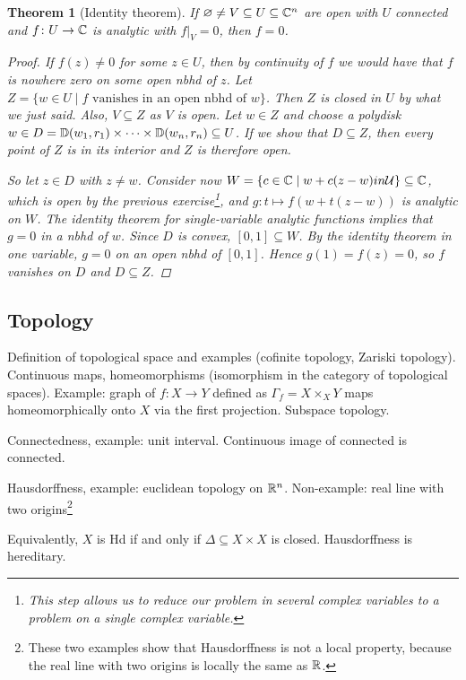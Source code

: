 \documentclass[A4paper, british]{amsart}
\theoremstyle{darkgreentheorem}
\newtheorem{thm}{Theorem}[section]
\theoremstyle{darkbluedefinition}
\theoremstyle{darkredexample}
\theoremstyle{remark}
\newcommand{\1}{\mathbbm{1}}
\newcommand{\fp}[1]{\times_{#1}}
\begin{document}
\begin{thm}[Identity theorem]
    If $\varnothing \neq V\subseteq U\subseteq \mathbb{C}^{n}$ are open with $U$ connected and $f\colon U\to \mathbb{C}$ is analytic with $f|_{V}=0$, then $f=0$.
    \begin{proof}
	If $f(z)\neq 0$ for some $z\in U$, then by continuity of $f$ we would have that $f$ is nowhere zero on some open nbhd of $z$.
	Let $Z=\{w\in U\mid f \text{ vanishes in an open nbhd of }w\}$.
	Then $Z$ is closed in $U$ by what we just said.
	Also, $V\subseteq Z$ as $V$ is open.
	Let $w\in Z$ and choose a polydisk $w\in D=\mathbb{D}(w_{1},r_{1})\times \cdots \times \mathbb{D}(w_{n},r_{n})\subseteq U$.
	If we show that $D\subseteq Z$, then every point of $Z$ is in its interior and $Z$ is therefore open.
	
	So let $z\in D$ with $z\neq w$.
	Consider now $W=\{c\in \mathbb{C}\mid w+c(z-w)in \mathcal{U}\}\subseteq \mathbb{C}$, which is open by the previous exercise\footnote{This step allows us to reduce our problem in several complex variables to a problem on a single complex variable.}, and $g\colon t\mapsto f(w+t(z-w))$ is analytic on $W$.
	The identity theorem for single-variable analytic functions implies that $g=0$ in a nbhd of $w$.
	Since $D$ is convex, $[0,1]\subseteq W$.
	By the identity theorem in one variable, $g=0$ on an open nbhd of $[0,1]$.
	Hence $g(1)=f(z)=0$, so $f$ vanishes on $D$ and $D\subseteq Z$.
    \end{proof}
\end{thm}

\subsection{Topology}

Definition of topological space and examples (cofinite topology, Zariski topology).
Continuous maps, homeomorphisms (isomorphism in the category of topological spaces).
Example: graph of $f\colon X\to Y$ defined as $\Gamma_{f}=X\fp{X}Y$ maps homeomorphically onto $X$ via the first projection.
Subspace topology.

Connectedness, example: unit interval.
Continuous image of connected is connected.

Hausdorffness, example: euclidean topology on $\mathbb{R}^{n}$.
Non-example: real line with two origins\footnote{These two examples show that Hausdorffness is not a local property, because the real line with two origins is locally the same as $\mathbb{R}$.}

Equivalently, $X$ is Hd if and only if $\Delta\subseteq X\times X$ is closed.
Hausdorffness is hereditary.
\end{document}
